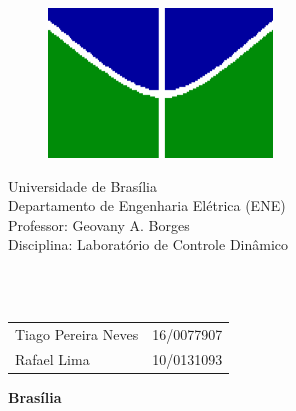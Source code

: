 \begin{figure}[h!]
\centering
\includegraphics[scale=0.9]{img/simb_unb.png}
\label{fig:unb}
\end{figure}

\begin{center}
{\LARGE Universidade de Brasília}\\
Departamento de Engenharia Elétrica (ENE)\\
Professor: Geovany A. Borges\\
Disciplina: Laboratório de Controle Dinâmico\\
\end{center}


\vspace{0.18\textheight}

\begin{center}
    \Huge \textbf{\\\thetitle \\}
\end{center}

\vspace*{\fill} %


\begin{table}[H]
    \begin{tabular}{ll}
        Tiago Pereira Neves & 16/0077907 \\
        Rafael Lima & 10/0131093 \\
    \end{tabular}
\end{table}

\vspace{0.5cm}

\begin{center}
    \textbf{Brasília\\
    \the\year} %
\end{center}

\thispagestyle{empty} %

\newpage
\tableofcontents
\newpage

